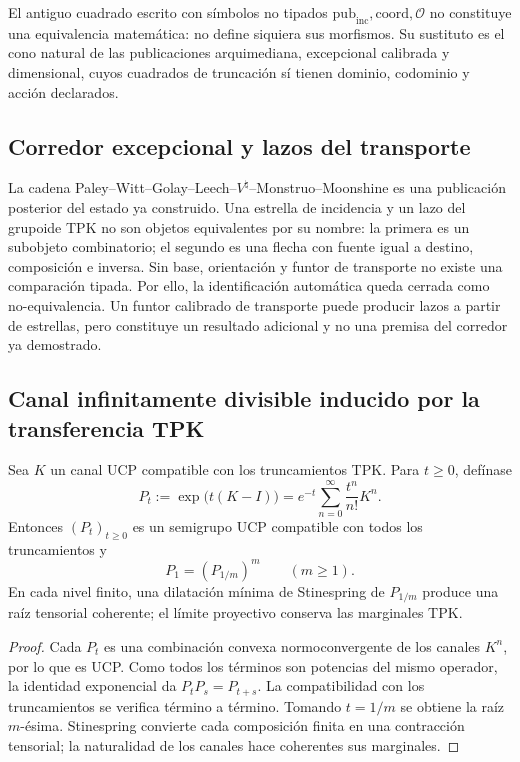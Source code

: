 El antiguo cuadrado escrito con símbolos no tipados
\(\mathrm{pub}_{\mathrm{inc}},\mathrm{coord},\mathcal O\) no constituye una
equivalencia matemática: no define siquiera sus morfismos. Su sustituto es el
cono natural de las publicaciones arquimediana, excepcional calibrada y
dimensional, cuyos cuadrados de truncación sí tienen dominio, codominio y
acción declarados.

\subsection{Corredor excepcional y lazos del transporte}

La cadena Paley--Witt--Golay--Leech--\(V^{\natural}\)--Monstruo--Moonshine
es una publicación posterior del estado ya construido. Una estrella de
incidencia y un lazo del grupoide TPK no son objetos equivalentes por su
nombre: la primera es un subobjeto combinatorio; el segundo es una flecha con
fuente igual a destino, composición e inversa. Sin base, orientación y funtor
de transporte no existe una comparación tipada. Por ello, la identificación
automática queda cerrada como no-equivalencia. Un funtor calibrado de
transporte puede producir lazos a partir de estrellas, pero constituye un
resultado adicional y no una premisa del corredor ya demostrado.

\subsection{Canal infinitamente divisible inducido por la transferencia TPK}

\begin{theorem}
\label{thm:hmt-final-poissonizacion-ucp}
Sea \(K\) un canal UCP compatible con los truncamientos TPK\@. Para \(t\ge0\),
defínase
\[
 P_t:=\exp\bigl(t(K-I)\bigr)
 =e^{-t}\sum_{n=0}^{\infty}\frac{t^n}{n!}K^n.
\]
Entonces \((P_t)_{t\ge0}\) es un semigrupo UCP compatible con todos los
truncamientos y
\[
 P_1=(P_{1/m})^m
 \qquad(m\ge1).
\]
En cada nivel finito, una dilatación mínima de Stinespring de \(P_{1/m}\)
produce una raíz tensorial coherente; el límite proyectivo conserva las
marginales TPK.
\end{theorem}

\begin{proof}
Cada \(P_t\) es una combinación convexa normoconvergente de los canales
\(K^n\), por lo que es UCP\@. Como todos los términos son potencias del mismo
operador, la identidad exponencial da \(P_tP_s=P_{t+s}\). La compatibilidad
con los truncamientos se verifica término a término. Tomando \(t=1/m\) se
obtiene la raíz \(m\)-ésima. Stinespring convierte cada composición finita en
una contracción tensorial; la naturalidad de los canales hace coherentes sus
marginales.
\end{proof}

